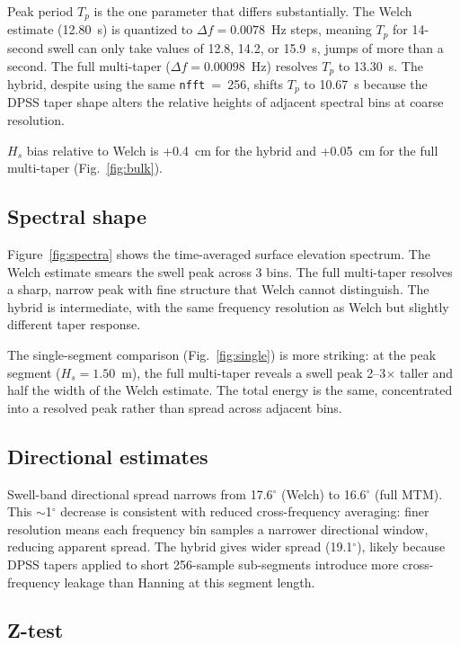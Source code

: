 \documentclass[11pt]{article}
\begin{document}
Peak period $T_p$ is the one parameter that differs substantially.
The Welch estimate (12.80~s) is quantized to $\Delta f = 0.0078$~Hz
steps, meaning $T_p$ for 14-second swell can only take values of
12.8, 14.2, or 15.9~s, jumps of more than a second. The full
multi-taper ($\Delta f = 0.00098$~Hz) resolves $T_p$ to 13.30~s. The
hybrid, despite using the same \texttt{nfft}~=~256, shifts $T_p$ to
10.67~s because the DPSS taper shape alters the relative heights of
adjacent spectral bins at coarse resolution.

$H_s$ bias relative to Welch is +0.4~cm for the hybrid and +0.05~cm
for the full multi-taper (Fig.~\ref{fig:bulk}).

\subsection{Spectral shape}

Figure~\ref{fig:spectra} shows the time-averaged surface elevation
spectrum. The Welch estimate smears the swell peak across 3 bins. The
full multi-taper resolves a sharp, narrow peak with fine structure
that Welch cannot distinguish. The hybrid is intermediate, with the same
frequency resolution as Welch but slightly different taper response.

The single-segment comparison (Fig.~\ref{fig:single}) is more
striking: at the peak segment ($H_s = 1.50$~m), the full multi-taper
reveals a swell peak 2--3$\times$ taller and half the width of the
Welch estimate. The total energy is the same, concentrated into a resolved
peak rather than spread across adjacent bins.

\subsection{Directional estimates}

Swell-band directional spread narrows from 17.6$^\circ$ (Welch) to
16.6$^\circ$ (full MTM). This $\sim$1$^\circ$ decrease is consistent
with reduced cross-frequency averaging: finer resolution means each
frequency bin samples a narrower directional window, reducing
apparent spread. The hybrid gives wider spread (19.1$^\circ$), likely
because DPSS tapers applied to short 256-sample sub-segments
introduce more cross-frequency leakage than Hanning at this segment
length.

\subsection{Z-test}
\end{document}
